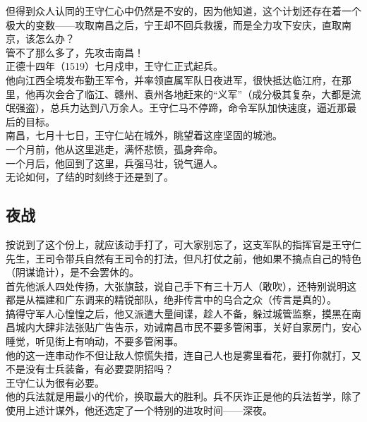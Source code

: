 \begin{multicols}{\theparacolNo}
但得到众人认同的王守仁心中仍然是不安的，因为他知道，这个计划还存在着一个极大的变数——攻取南昌之后，宁王却不回兵救援，而是全力攻下安庆，直取南京，该怎么办？\\

管不了那么多了，先攻击南昌！\\

正德十四年（1519）七月戍申，王守仁正式起兵。\\

他向江西全境发布勤王军令，并率领直属军队日夜进军，很快抵达临江府，在那里，他再次会合了临江、赣州、袁州各地赶来的“义军”（成分极其复杂，大都是流氓强盗），总兵力达到八万余人。王守仁马不停蹄，命令军队加快速度，逼近那最后的目标。\\

南昌，七月十七日，王守仁站在城外，眺望着这座坚固的城池。\\

一个月前，他从这里逃走，满怀悲愤，孤身奔命。\\

一个月后，他回到了这里，兵强马壮，锐气逼人。\\

无论如何，了结的时刻终于还是到了。\\

\subsection{夜战}
按说到了这个份上，就应该动手打了，可大家别忘了，这支军队的指挥官是王守仁先生，王司令带兵自然有王司令的打法，但凡打仗之前，他如果不搞点自己的特色（阴谋诡计），是不会罢休的。\\

首先他派人四处传扬，大张旗鼓，说自己手下有三十万人（敢吹），还特别说明这都是从福建和广东调来的精锐部队，绝非传言中的乌合之众（传言是真的）。\\

搞得守军人心惶惶之后，他又派遣大量间谍，趁人不备，躲过城管监察，摸黑在南昌城内大肆非法张贴广告告示，劝诫南昌市民不要多管闲事，关好自家房门，安心睡觉，听见街上有响动，不要多管闲事。\\

他的这一连串动作不但让敌人惊慌失措，连自己人也是雾里看花，要打你就打，又不是没有士兵装备，有必要耍阴招吗？\\

王守仁认为很有必要。\\

他的兵法就是用最小的代价，换取最大的胜利。兵不厌诈正是他的兵法哲学，除了使用上述计谋外，他还选定了一个特别的进攻时间——深夜。\\


\end{multicols}
